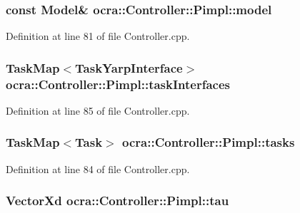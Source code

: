 \subsubsection[{\texorpdfstring{model}{model}}]{\setlength{\rightskip}{0pt plus 5cm}const {\bf Model}\& ocra\+::\+Controller\+::\+Pimpl\+::model}\hypertarget{structocra_1_1Controller_1_1Pimpl_aadf5eccdc9453d1f277f62b7becf7390}{}\label{structocra_1_1Controller_1_1Pimpl_aadf5eccdc9453d1f277f62b7becf7390}


Definition at line 81 of file Controller.\+cpp.

\subsubsection[{\texorpdfstring{task\+Interfaces}{taskInterfaces}}]{\setlength{\rightskip}{0pt plus 5cm}Task\+Map$<${\bf Task\+Yarp\+Interface}$>$ ocra\+::\+Controller\+::\+Pimpl\+::task\+Interfaces}\hypertarget{structocra_1_1Controller_1_1Pimpl_a396836991948d8d90cf5852330d2c5c3}{}\label{structocra_1_1Controller_1_1Pimpl_a396836991948d8d90cf5852330d2c5c3}


Definition at line 85 of file Controller.\+cpp.

\subsubsection[{\texorpdfstring{tasks}{tasks}}]{\setlength{\rightskip}{0pt plus 5cm}Task\+Map$<${\bf Task}$>$ ocra\+::\+Controller\+::\+Pimpl\+::tasks}\hypertarget{structocra_1_1Controller_1_1Pimpl_a246fa1cc15ad20293ef78b04dc0dbe70}{}\label{structocra_1_1Controller_1_1Pimpl_a246fa1cc15ad20293ef78b04dc0dbe70}


Definition at line 84 of file Controller.\+cpp.

\subsubsection[{\texorpdfstring{tau}{tau}}]{\setlength{\rightskip}{0pt plus 5cm}Vector\+Xd ocra\+::\+Controller\+::\+Pimpl\+::tau}\hypertarget{structocra_1_1Controller_1_1Pimpl_a06e7fceb4a0a3c678a4e26fc12946e5c}{}\label{structocra_1_1Controller_1_1Pimpl_a06e7fceb4a0a3c678a4e26fc12946e5c}


